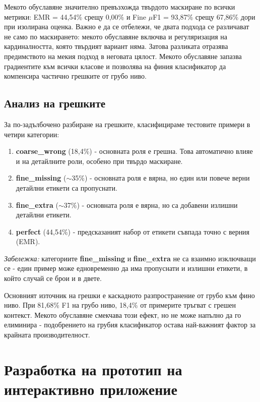 \documentclass[12pt,a4paper]{report}
\begin{document}
Мекото обуславяне значително превъзхожда твърдото маскиране по всички метрики: EMR = 44,54\% срещу 0,00\% и Fine $\mu$F1 = 93,87\% срещу 67,86\% дори при изолирана оценка. Важно е да се отбележи, че двата подхода се различават не само по маскирането: мекото обуславяне включва и регуляризация на кардиналността, която твърдият вариант няма. Затова разликата отразява предимството на мекия подход в неговата цялост. Мекото обуславяне запазва градиентите към всички класове и позволява на финия класификатор да компенсира частично грешките от грубо ниво.


\section{Анализ на грешките}
\label{sec:error_analysis}

За по-задълбочено разбиране на грешките, класифицираме тестовите примери в четири категории:

\begin{enumerate}
  \item \textbf{coarse\_wrong} (18,4\%) - основната роля е грешна. Това автоматично влияе и на детайлните роли, особено при твърдо маскиране.
  \item \textbf{fine\_missing} ($\sim$35\%) - основната роля е вярна, но един или повече верни детайлни етикети са пропуснати.
  \item \textbf{fine\_extra} ($\sim$37\%) - основната роля е вярна, но са добавени излишни детайлни етикети.
  \item \textbf{perfect} (44,54\%) - предсказаният набор от етикети съвпада точно с верния (EMR).
\end{enumerate}

\textit{Забележка:} категориите \textbf{fine\_missing} и \textbf{fine\_extra} не са взаимно изключващи се - един пример може едновременно да има пропуснати и излишни етикети, в който случай се брои и в двете.

Основният източник на грешки е каскадното разпространение от грубо към фино ниво. При 81,68\% F1 на грубо ниво, 18,4\% от примерите тръгват с грешен контекст. Мекото обуславяне смекчава този ефект, но не може напълно да го елиминира - подобрението на грубия класификатор остава най-важният фактор за крайната производителност.


\chapter{Разработка на прототип на интерактивно приложение}
\label{ch:demo}
\end{document}
